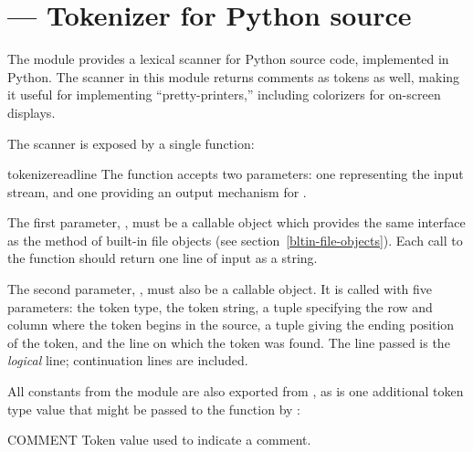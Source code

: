 \section{ ---
         Tokenizer for Python source}



The  module provides a lexical scanner for Python
source code, implemented in Python.  The scanner in this module
returns comments as tokens as well, making it useful for implementing
``pretty-printers,'' including colorizers for on-screen displays.

The scanner is exposed by a single function:


\begin{funcdesc}{tokenize}{readline}
  The  function accepts two parameters: one
  representing the input stream, and one providing an output mechanism 
  for .

  The first parameter, , must be a callable object which
  provides the same interface as the  method of
  built-in file objects (see section~\ref{bltin-file-objects}).  Each
  call to the function should return one line of input as a string.

  The second parameter, , must also be a callable
  object.  It is called with five parameters: the token type, the
  token string, a tuple  specifying the 
  row and column where the token begins in the source, a tuple
   giving the ending position of the
  token, and the line on which the token was found.  The line passed
  is the \emph{logical} line; continuation lines are included.
\end{funcdesc}


All constants from the  module are also exported from 
, as is one additional token type value that might be 
passed to the  function by :

\begin{datadesc}{COMMENT}
  Token value used to indicate a comment.
\end{datadesc}
